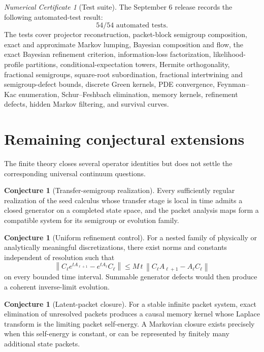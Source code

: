 \documentclass[11pt,a4paper]{article}
\theoremstyle{definition}
\newtheorem{conjecture}[theorem]{Conjecture}
\theoremstyle{remark}
\newtheorem{certificate}[theorem]{Numerical Certificate}
\newcommand{\norm}[1]{\left\lVert#1\right\rVert}
\begin{document}
\begin{certificate}[Test suite]\label{core:record:046}
The September 6 release records the following automated-test result:
\[
\boxed{54/54\text{ automated tests}.}
\]
The tests cover projector reconstruction, packet-block semigroup composition, exact and approximate Markov lumping, Bayesian composition and flow, the exact Bayesian refinement criterion, information-loss factorization, likelihood-profile partitions, conditional-expectation towers, Hermite orthogonality, fractional semigroups, square-root subordination, fractional intertwining and semigroup-defect bounds, discrete Green kernels, PDE convergence, Feynman--Kac enumeration, Schur--Feshbach elimination, memory kernels, refinement defects, hidden Markov filtering, and survival curves.
\end{certificate}

\section{Remaining conjectural extensions}\label{core:section:17}

The finite theory closes several operator identities but does not settle the corresponding universal continuum questions.

\begin{conjecture}[Transfer-semigroup realization]\label{core:record:047}
Every sufficiently regular realization of the seed calculus whose transfer stage is local in time admits a closed generator on a completed state space, and the packet analysis maps form a compatible system for its semigroup or evolution family.
\end{conjecture}

\begin{conjecture}[Uniform refinement control]\label{core:record:048}
For a nested family of physically or analytically meaningful discretizations, there exist norms and constants independent of resolution such that
\[
\norm{C_\ell e^{tA_{\ell+1}}-e^{tA_\ell}C_\ell}
\le
M\,t\,\norm{C_\ell A_{\ell+1}-A_\ell C_\ell}
\]
on every bounded time interval. Summable generator defects would then produce a coherent inverse-limit evolution.
\end{conjecture}

\begin{conjecture}[Latent-packet closure]\label{core:record:049}
For a stable infinite packet system, exact elimination of unresolved packets produces a causal memory kernel whose Laplace transform is the limiting packet self-energy. A Markovian closure exists precisely when this self-energy is constant, or can be represented by finitely many additional state packets.
\end{conjecture}
\end{document}
